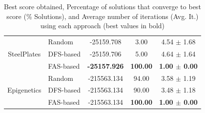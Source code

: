 \begin{table}[ h ]
\begin{tabular}{|c|l|c|c|c|}
			\multirow{3}{*}{SteelPlates} & Random & -25159.708 & 3.00 & 4.54 $\pm$ 1.68 \\ \cline{2-5} 
					& DFS-based & -25159.706 & 5.00 & 4.64 $\pm$ 1.64 \\ \cline{2-5}
					& FAS-based & \textbf{-25157.926} & \textbf{100.00} & \textbf{1.00 $\pm$ 0.00} \\ \hline
			\multirow{3}{*}{Epigenetics} & Random & -215563.134 & 94.00 & 3.58 $\pm$ 1.19 \\ \cline{2-5} 
					& DFS-based & -215563.134 & 90.00 & 3.48 $\pm$ 1.18 \\ \cline{2-5}
					& FAS-based & -215563.134 & \textbf{100.00} & \textbf{1.00 $\pm$ 0.00} \\ \hline
		\end{tabular}
		\caption{Best score obtained, Percentage of solutions that converge to best score (\% Solutions), and Average number of iterations (Avg. It.) using each approach (best values in bold)}
		\label{tab:comparison}
	\end{table}
	
